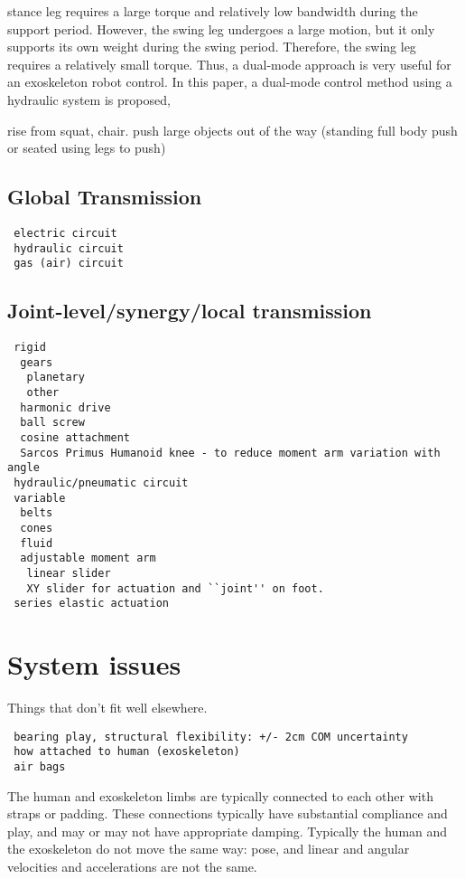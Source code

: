 \documentclass[letterpaper,12pt,fullpage]{article}
\begin{document}
stance leg requires a large torque and
relatively low bandwidth during the support period. However,
the swing leg undergoes a large motion, but it only supports
its own weight during the swing period. Therefore, the swing
leg requires a relatively small torque. Thus, a dual-mode
approach is very useful for an exoskeleton robot control.
In this paper, a dual-mode control method using a hydraulic
system is proposed,~\cite{IEEE07222598}

rise from squat, chair.
push large objects out of the way (standing full body push
or seated using legs to push)

\subsection{Global Transmission}

\begin{verbatim}
 electric circuit
 hydraulic circuit
 gas (air) circuit
\end{verbatim}

\subsection{Joint-level/synergy/local transmission}

\begin{verbatim}
 rigid
  gears
   planetary
   other
  harmonic drive
  ball screw
  cosine attachment
  Sarcos Primus Humanoid knee - to reduce moment arm variation with angle
 hydraulic/pneumatic circuit
 variable
  belts
  cones
  fluid
  adjustable moment arm
   linear slider
   XY slider for actuation and ``joint'' on foot.
 series elastic actuation
\end{verbatim}

\section{System issues}

Things that don't fit well elsewhere.

\begin{verbatim}
 bearing play, structural flexibility: +/- 2cm COM uncertainty
 how attached to human (exoskeleton)
 air bags
\end{verbatim}

The human and exoskeleton limbs are typically connected to each
other with straps or padding. These connections typically have substantial
compliance and play, and may or may not have appropriate damping.
Typically the human and the exoskeleton do not move the same way:
pose, and linear and angular velocities and accelerations are not the same.
\end{document}
